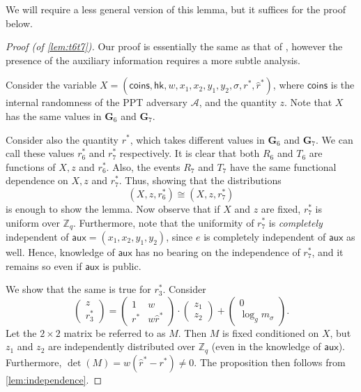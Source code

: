 \documentclass[10pt,a4paper]{article}
\newcommand{\adv}{\mathcal{A}}
\newcommand{\aux}{\mathsf{aux}}
\newcommand{\hk}{\mathsf{hk}}
\newcommand{\game}{\mathbf{G}}
\newcommand{\Z}{\mathbb{Z}}
\begin{document}
	We will require a less general version of this lemma, but it suffices for the proof below.

	\begin{proof}[Proof (of \cref{lem:t6t7})]
		Our proof is essentially the same as that of \cite{cs01}, however the presence of the auxiliary information requires a more subtle analysis.
		
		Consider the variable $X=(\mathsf{coins},\hk,w,x_1,x_2,y_1,y_2,\sigma,r^{*},\hat{r}^{*})$, where $\mathsf{coins}$ is the internal randomness of the PPT adversary $\adv$, and the quantity $z$. Note that $X$ has the same values in $\game_6$ and $\game_7$.
		
		Consider also the quantity $r^{*}$, which takes different values in $\game_6$ and $\game_7$. We can call these values $r_6^{*}$ and $r^{*}_7$ respectively. It is clear that both $R_6$ and $T_6$ are functions of $X,z$ and $r^{*}_6$. Also, the events $R_7$ and $T_7$ have the same functional dependence on $X,z$ and $r^{*}_7$. Thus, showing that the distributions
		$$(X, z, r^{*}_6)\cong(X, z, r^{*}_7)$$ is enough to show the lemma. Now observe that if $X$ and $z$ are fixed, $r^{*}_7$ is uniform over $\Z_q$. Furthermore, note that the uniformity of $r^{*}_7$ is \textit{completely} independent of $\aux = (x_1,x_2,y_1,y_2)$, since $e$ is completely independent of $\aux$ as well. Hence, knowledge of $\aux$ has no bearing on the independence of $r^{*}_7$, and it remains so even if $\aux$ is public.
		
		We show that the same is true for $r^{*}_3$. Consider
		\begin{equation*}
			\begin{pmatrix}
				z\\
				r^{*}_3
			\end{pmatrix}=
		\begin{pmatrix}
			1 & w\\
			r^{*} & w\hat{r}^{*}
		\end{pmatrix}\cdot
		\begin{pmatrix}
			z_1\\
			z_2
		\end{pmatrix}+
		\begin{pmatrix}
			0\\
			\log_gm_{\sigma}
		\end{pmatrix}.
		\end{equation*}
		Let the $2\times 2$ matrix be referred to as $M$. Then $M$ is fixed conditioned on $X$, but $z_1$ and $z_2$ are independently distributed over $\Z_q$ (even in the knowledge of $\aux$). Furthermore, $\det(M) = w(\hat{r}^{*} - r^{*})\neq 0$. The proposition then follows from \cref{lem:independence}.
	\end{proof}
\end{document}
